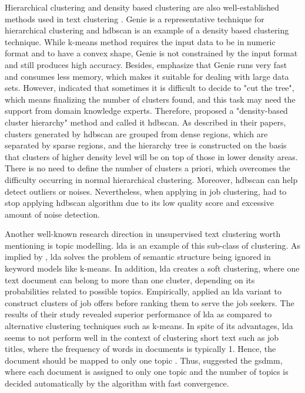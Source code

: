 \documentclass[a4paper,man,floatsintext,natbib,noextraspace]{apa6}
\begin{document}
Hierarchical clustering and density based clustering are also well-established methods used in text clustering \citep{suyalTextClusteringAlgorithms2014}. Genie is a representative technique for hierarchical clustering and \gls{hdbscan} is an example of a density based clustering technique. While k-means method requires the input data to be in numeric format and to have a convex shape, Genie is not constrained by the input format and still produces high accuracy. Besides, \cite{gagolewskiGenieNewFast2016a} emphasize that Genie runs very fast and consumes less memory, which makes it suitable for dealing with large data sets. However, \cite{suyalTextClusteringAlgorithms2014} indicated that sometimes it is difficult to decide to "cut the tree", which means finalizing the number of clusters found, and this task may need the support from domain knowledge experts. Therefore, \cite{campelloDensitybasedClusteringBased2013} proposed a "density-based cluster hierarchy" method and called it \gls{hdbscan}. As described in their papers, clusters generated by \gls{hdbscan} are grouped from dense regions, which are separated by sparse regions, and the hierarchy tree is constructed on the basis that clusters of higher density level will be on top of those in lower density areas. There is no need to define the number of clusters a priori, which overcomes the difficulty occurring in normal hierarchical clustering. Moreover, \gls{hdbscan} can help detect outliers or noises.  Nevertheless, when applying in job clustering, \cite{vinelExperimentalComparisonUnsupervised2019} had to stop applying \gls{hdbscan} algorithm due to its low quality score and excessive amount of noise detection.

Another well-known research direction in unsupervised text clustering worth mentioning is topic modelling. \gls{lda} is an example of this sub-class of clustering. As implied by \cite{sunTextualDocumentClustering2014}, \gls{lda} solves the problem of semantic structure being ignored in keyword models like k-means. In addition, \gls{lda} creates a soft clustering, where one text document can belong to more than one cluster, depending on its probabilities related to possible topics. Empirically, \cite{pochRankingJobOffers2014} applied an \gls{lda} variant to construct clusters of job offers before ranking them to serve the job seekers. The results of their study revealed superior performance of \gls{lda} as compared to alternative clustering techniques such as k-means. In spite of its advantages, \gls{lda} seems to not perform well in the context of clustering short text such as job titles, where the frequency of words in documents is typically 1. Hence, the document should be mapped to only one topic \citep{qiangShortTextTopic2020}. Thus, \cite{yinDirichletMultinomialMixture2014} suggested the \gls{gsdmm}, where each document is assigned to only one topic and the number of topics is decided automatically by the algorithm with fast convergence.
\end{document}
